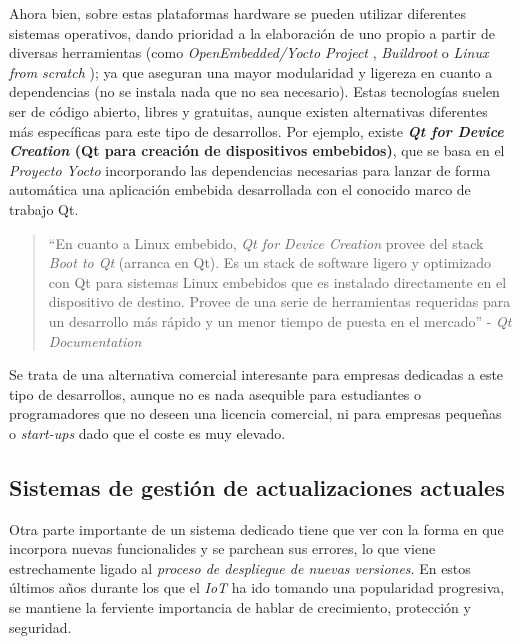 Ahora bien, sobre estas plataformas hardware se pueden utilizar diferentes sistemas operativos, dando prioridad a la elaboración de uno propio a partir de diversas herramientas (como \textit{OpenEmbedded/Yocto Project} \cite{yocto-project}, \textit{Buildroot} \cite{buildroot} o \textit{Linux from scratch} \cite{linux-from-scratch}); ya que aseguran una mayor modularidad y ligereza en cuanto a dependencias (no se instala nada que no sea necesario). Estas tecnologías suelen ser de código abierto, libres y gratuitas, aunque existen alternativas diferentes más específicas para este tipo de desarrollos. Por ejemplo, existe \textbf{\textit{Qt for Device Creation} (Qt para creación de dispositivos embebidos)}, que se basa en el \textit{Proyecto Yocto} incorporando las dependencias necesarias para lanzar de forma automática una aplicación embebida desarrollada con el conocido marco de trabajo Qt.

\begin{quotation}
	``En cuanto a Linux embebido, \textit{Qt for Device Creation} provee del stack \textit{Boot to Qt} (arranca en Qt). Es un stack de software ligero y optimizado con Qt para sistemas Linux embebidos que es instalado directamente en el dispositivo de destino. Provee de una serie de herramientas requeridas para un desarrollo más rápido y un menor tiempo de puesta en el mercado'' - \textit{Qt Documentation} \cite{qt-device-creation}
\end{quotation}

Se trata de una alternativa comercial interesante para empresas dedicadas a este tipo de desarrollos, aunque no es nada asequible para estudiantes o programadores que no deseen una licencia comercial, ni para empresas pequeñas o \textit{start-ups} dado que el coste es muy elevado.\\

\subsection{Sistemas de gestión de actualizaciones actuales}

Otra parte importante de un sistema dedicado tiene que ver con la forma en que incorpora nuevas funcionalides y se parchean sus errores, lo que viene estrechamente ligado al \textit{proceso de despliegue de nuevas versiones}. En estos últimos años durante los que el \textit{IoT} ha ido tomando una popularidad progresiva, se mantiene la ferviente importancia de hablar de crecimiento, protección y seguridad.\\

